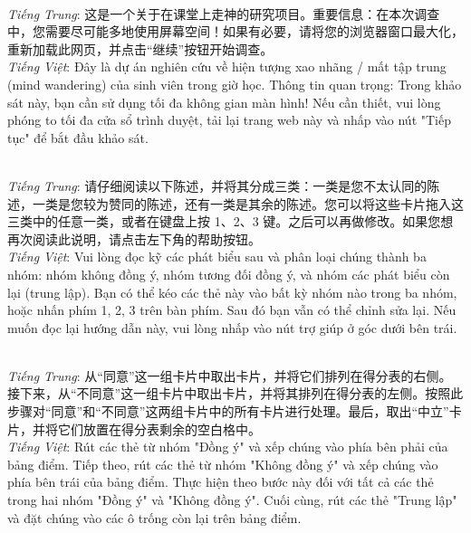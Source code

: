 \documentclass[11pt,a4paper]{article}
\begin{document}
\begin{description}[style=unboxed,leftmargin=0cm]
    \item[Chào mừng (Welcome Screen)] \hfill \\
    \textit{Tiếng Trung}: 这是一个关于在课堂上走神的研究项目。重要信息：在本次调查中，您需要尽可能多地使用屏幕空间！如果有必要，请将您的浏览器窗口最大化，重新加载此网页，并点击“继续”按钮开始调查。\\
    \textit{Tiếng Việt}: Đây là dự án nghiên cứu về hiện tượng xao nhãng / mất tập trung (mind wandering) của sinh viên trong giờ học. Thông tin quan trọng: Trong khảo sát này, bạn cần sử dụng tối đa không gian màn hình! Nếu cần thiết, vui lòng phóng to tối đa cửa sổ trình duyệt, tải lại trang web này và nhấp vào nút "Tiếp tục" để bắt đầu khảo sát.

    \item[Bước 1 / 5 (Step 1 of 5: Rough Sorting)] \hfill \\
    \textit{Tiếng Trung}: 请仔细阅读以下陈述，并将其分成三类：一类是您不太认同的陈述，一类是您较为赞同的陈述，还有一类是其余的陈述。您可以将这些卡片拖入这三类中的任意一类，或者在键盘上按 1、2、3 键。之后可以再做修改。如果您想再次阅读此说明，请点击左下角的帮助按钮。\\
    \textit{Tiếng Việt}: Vui lòng đọc kỹ các phát biểu sau và phân loại chúng thành ba nhóm: nhóm không đồng ý, nhóm tương đối đồng ý, và nhóm các phát biểu còn lại (trung lập). Bạn có thể kéo các thẻ này vào bất kỳ nhóm nào trong ba nhóm, hoặc nhấn phím 1, 2, 3 trên bàn phím. Sau đó bạn vẫn có thể chỉnh sửa lại. Nếu muốn đọc lại hướng dẫn này, vui lòng nhấp vào nút trợ giúp ở góc dưới bên trái.

    \item[Bước 2 / 5 (Step 2 of 5: Grid Placement)] \hfill \\
    \textit{Tiếng Trung}: 从“同意”这一组卡片中取出卡片，并将它们排列在得分表的右侧。接下来，从“不同意”这一组卡片中取出卡片，并将其排列在得分表的左侧。按照此步骤对“同意”和“不同意”这两组卡片中的所有卡片进行处理。最后，取出“中立”卡片，并将它们放置在得分表剩余的空白格中。\\
    \textit{Tiếng Việt}: Rút các thẻ từ nhóm "Đồng ý" và xếp chúng vào phía bên phải của bảng điểm. Tiếp theo, rút các thẻ từ nhóm "Không đồng ý" và xếp chúng vào phía bên trái của bảng điểm. Thực hiện theo bước này đối với tất cả các thẻ trong hai nhóm "Đồng ý" và "Không đồng ý". Cuối cùng, rút các thẻ "Trung lập" và đặt chúng vào các ô trống còn lại trên bảng điểm.


\end{description}
\end{document}
